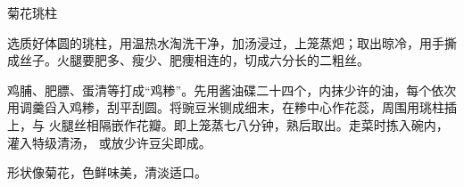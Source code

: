 %
%
%
%
%
%
%
\begin{recipe}{菊花珧柱}

\ingredients


\preparation

\step 选质好体圆的珧柱，用温热水淘洗干净，加汤浸过，上笼蒸𤆵；取出晾冷，用手撕
成丝子。火腿要肥多、瘦少、肥痩相连的，切成六分长的二粗丝。

\step 鸡脯、肥膘、蛋清等打成“鸡糁”。先用酱油碟二十四个，内抹少许的油，每个依次
用调羹舀入鸡糁，刮平刮圆。将豌豆米铡成细末，在糁中心作花蕊，周围用珧柱插上，与
火腿丝相隔嵌作花瓣。即上笼蒸七八分钟，熟后取出。走菜时拣入碗内，灌入特级清汤，
或放少许豆尖即成。

\features

形状像菊花，色鲜味美，清淡适口。

\end{recipe}

